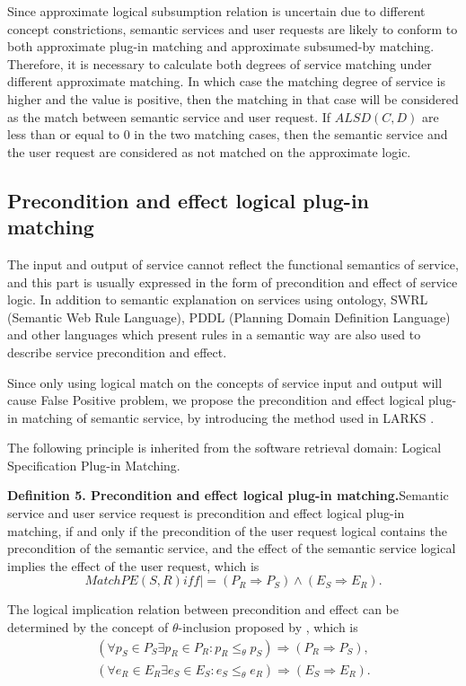 \documentclass{ieeeaccess}
\begin{document}
Since approximate logical subsumption relation is uncertain due to different concept constrictions, semantic services and user requests are likely to conform to both approximate plug-in matching and approximate subsumed-by matching.
Therefore, it is necessary to calculate both degrees of service matching under different approximate matching.
In which case the matching degree of service is higher and the value is positive, then the matching in that case will be considered as the match between semantic service and user request.
If $ALSD(C,D)$ are less than or equal to 0 in the two matching cases, then the semantic service and the user request are considered as not matched on the approximate logic.

\subsection{Precondition and effect logical plug-in matching}
The input and output of service cannot reflect the functional semantics of service, and this part is usually expressed in the form of precondition and effect of service logic. In addition to semantic explanation on services using ontology, SWRL (Semantic Web Rule Language), PDDL (Planning Domain Definition Language) and other languages which present rules in a semantic way are also used to describe service precondition and effect. 

Since only using logical match on the concepts of service input and output will cause False Positive problem, we propose the precondition and effect logical plug-in matching of semantic service, by introducing the method used in LARKS \cite{sycara5dynamic}.

The following principle is inherited from the software retrieval domain: Logical Specification Plug-in Matching.

\textbf{Definition 5. Precondition and effect logical plug-in matching.}Semantic service and user service request is precondition and effect logical plug-in matching, if and only if the precondition of the user request logical contains the precondition of the semantic service, and the effect of the semantic service logical implies the effect of the user request, which is
\begin{equation}
MatchPE\left( S,R \right)iff\left| = \right.\left( {{P}_{R}}\Rightarrow {{P}_{S}} \right)\wedge \left( {{E}_{S}}\Rightarrow {{E}_{R}} \right).
\end{equation}

The logical implication relation between precondition and effect can be determined by the concept of $\theta$-inclusion proposed by \cite{idestam1995generalization}, which is
\begin{align}
( \forall {{p}_{S}}\in {{P}_{S}}\exists {{p}_{R}}\in {{P}_{R}}:{{p}_{R}}{{\le }_{\theta }}{{p}_{S}} )\Rightarrow ( {{P}_{R}}\Rightarrow {{P}_{S}} ), \nonumber\\
( \forall {{e}_{R}}\in {{E}_{R}}\exists {{e}_{S}}\in {{E}_{S}}:{{e}_{S}}{{\le }_{\theta }}{{e}_{R}} )\Rightarrow ( {{E}_{S}}\Rightarrow {{E}_{R}} ).
\end{align}
\end{document}
